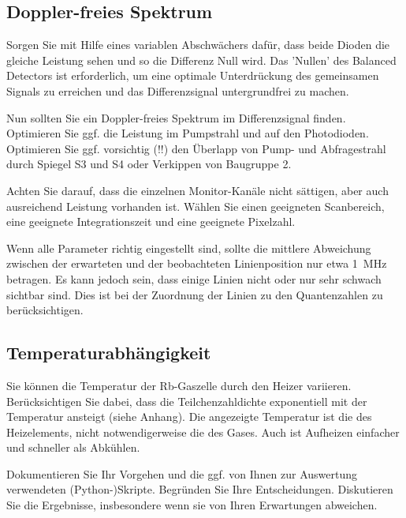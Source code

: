 \subsection{Doppler-freies Spektrum}


Sorgen Sie  mit Hilfe eines variablen Abschwächers dafür, dass beide Dioden die gleiche Leistung sehen und so die Differenz Null wird. Das 'Nullen' des Balanced Detectors ist erforderlich, um eine optimale Unterdrückung des gemeinsamen Signals zu erreichen und das Differenzsignal untergrundfrei zu machen.

Nun sollten Sie ein Doppler-freies Spektrum im  Differenzsignal  finden. Optimieren Sie ggf. die Leistung im Pumpstrahl und auf den Photodioden. Optimieren Sie ggf. vorsichtig (!!) den Überlapp von Pump- und Abfragestrahl durch Spiegel S3 und S4 oder Verkippen von Baugruppe 2.

Achten Sie darauf, dass die einzelnen Monitor-Kanäle nicht sättigen, aber auch ausreichend Leistung vorhanden ist. Wählen Sie einen geeigneten Scanbereich, eine geeignete Integrationszeit und eine geeignete Pixelzahl.

Wenn alle Parameter richtig eingestellt sind, sollte die mittlere Abweichung zwischen der erwarteten und der beobachteten Linienposition nur etwa 1~MHz betragen. Es kann jedoch sein, dass einige Linien nicht oder nur sehr schwach sichtbar sind. Dies ist bei der Zuordnung der Linien zu den Quantenzahlen zu berücksichtigen.

\subsection{Temperaturabhängigkeit}

Sie können die Temperatur der Rb-Gaszelle durch den Heizer variieren. Berücksichtigen Sie dabei, dass die Teilchenzahldichte exponentiell mit der Temperatur ansteigt (siehe Anhang). Die angezeigte Temperatur ist die des Heizelements, nicht notwendigerweise die des Gases. Auch ist Aufheizen einfacher und schneller als Abkühlen.



\auftraege


Dokumentieren Sie Ihr Vorgehen und die ggf. von Ihnen zur Auswertung verwendeten (Python-)Skripte. Begründen Sie Ihre Entscheidungen. Diskutieren Sie die Ergebnisse, insbesondere wenn sie von Ihren Erwartungen abweichen.


		
